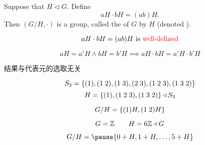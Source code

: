 \begin{frame}
  \begin{definition}
    Suppose that $H \triangleleft G$.
    Define
    \[
      aH \cdot bH = (ab)H.
    \]
    Then $(G/H, \cdot)$ is a group, called the  of $G$ by $H$
    (denoted ).
  \end{definition}
\end{frame}

\begin{frame}
  \[
    aH \cdot bH = (ab)H \text{ is \textcolor{red}{well-defined}}
  \]

  \pause
  \[
    aH = a'H \land bH = b'H \implies aH \cdot bH = a'H \cdot b'H
  \]
  \begin{center}
    结果与代表元的选取无关
  \end{center}
\end{frame}

\begin{frame}
  \[
    S_{3} = \{(1), (1\; 2), (1\; 3), (2\; 3), (1\; 2\; 3), (1\; 3\; 2)\}
  \]
  \[
    H = \{(1), (1\; 2\; 3), (1\; 3\; 2)\} \triangleleft S_{3}
  \]

  \pause
  \[
    G/H = \{(1)H, (1\;2)H\}
  \]
\end{frame}

\begin{frame}
  \[
    G = \mathbb{Z} \qquad H = 6\mathbb{Z} \triangleleft G
  \]

  \[
    G/H = \pause \set{0 + H, 1 + H, \dots, 5 + H}
  \]
\end{frame}
